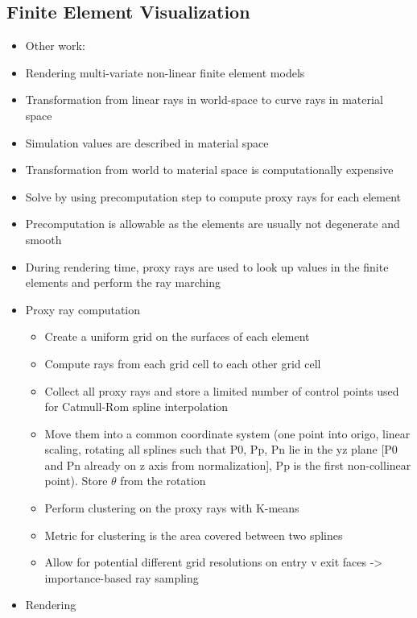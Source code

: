 \subsection{Finite Element Visualization}
\label{contributions:medbio:fem}
\begin{itemize}
\item Other work: \cite{Liu12Fem}
\item Rendering multi-variate non-linear finite element models
\item Transformation from linear rays in world-space to curve rays in material space
\item Simulation values are described in material space
\item Transformation from world to material space is computationally expensive
\item Solve by using precomputation step to compute proxy rays for each element
\item Precomputation is allowable as the elements are usually not degenerate and smooth
\item During rendering time, proxy rays are used to look up values in the finite elements and perform the ray marching
\item Proxy ray computation
\begin{itemize}
    \item Create a uniform grid on the surfaces of each element
    \item Compute rays from each grid cell to each other grid cell
    \item Collect all proxy rays and store a limited number of control points used for Catmull-Rom spline interpolation 
    \item Move them into a common coordinate system (one point into origo, linear scaling, rotating all splines such that P0, Pp, Pn lie in the yz plane [P0 and Pn already on z axis from normalization], Pp is the first non-collinear point). Store $\theta$ from the rotation
    \item Perform clustering on the proxy rays \cite{abraham03clustering} with K-means \cite{hartigan75kmeans}
    \item Metric for clustering is the area covered between two splines
    \item Allow for potential different grid resolutions on entry v exit faces -> importance-based ray sampling
\end{itemize}
\item Rendering
\begin{itemize}

\end{itemize}
\end{itemize}
